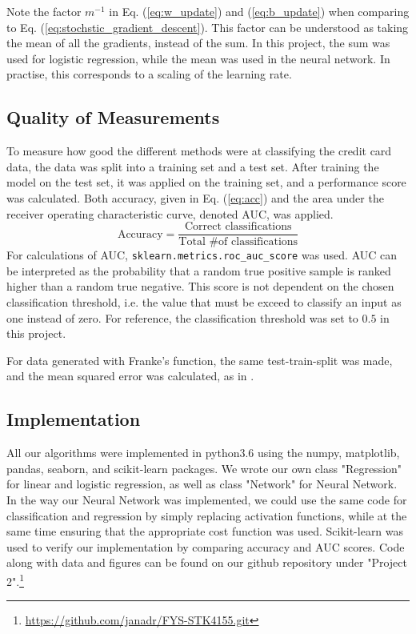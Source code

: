 Note the factor $m^{-1}$ in Eq. (\ref{eq:w_update}) and (\ref{eq:b_update}) when comparing to Eq. (\ref{eq:stochstic_gradient_descent}). This factor can be understood as taking the mean of all the gradients, instead of the sum. In this project, the sum was used for logistic regression, while the mean was used in the neural network. In practise, this corresponds to a scaling of the learning rate.

\subsection{Quality of Measurements}
To measure how good the different methods were at classifying the credit card data, the data was split into a training set and a test set. After training the model on the test set, it was applied on the training set, and a performance score was calculated. Both accuracy, given in Eq. (\ref{eq:acc}) and the area under the receiver operating characteristic curve, denoted AUC, was applied.
\begin{equation}\label{eq:acc}
  \text{Accuracy} = \frac{\text{Correct classifications}}{\text{Total \# of classifications}}
\end{equation}
For calculations of AUC, \texttt{sklearn.metrics.roc\_auc\_score} was used. AUC can be interpreted as the probability that a random true positive sample is ranked higher than a random true negative. This score is not dependent on the chosen classification threshold, i.e. the value that must be exceed to classify an input as one instead of zero. For reference, the classification threshold was set to $0.5$ in this project.  

For data generated with Franke's function, the same test-train-split was made, and the mean squared error was calculated, as in \cite{prosjekt1}.

\subsection{Implementation}
All our algorithms were implemented in python3.6 using the numpy, matplotlib, pandas, seaborn,
and scikit-learn packages. We wrote our own class "Regression" for linear and logistic
regression, as well as class "Network" for Neural Network. In the way our Neural Network was implemented, we could use the same code for classification and regression by simply replacing activation functions, while at the same time ensuring that the appropriate cost function was used.
Scikit-learn was used to verify our implementation by comparing accuracy and AUC scores.
Code along with data and figures can be found on our github repository under "Project 2".\footnote{\url{https://github.com/janadr/FYS-STK4155.git}}

